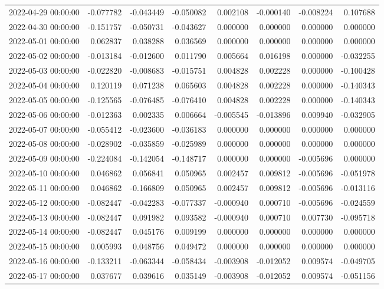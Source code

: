 \begin{tabular}{lrrrrrrr}
2022-04-29 00:00:00 & -0.077782 & -0.043449 & -0.050082 & 0.002108 & -0.000140 & -0.008224 & 0.107688 \\
2022-04-30 00:00:00 & -0.151757 & -0.050731 & -0.043627 & 0.000000 & 0.000000 & 0.000000 & 0.000000 \\
2022-05-01 00:00:00 & 0.062837 & 0.038288 & 0.036569 & 0.000000 & 0.000000 & 0.000000 & 0.000000 \\
2022-05-02 00:00:00 & -0.013184 & -0.012600 & 0.011790 & 0.005664 & 0.016198 & 0.000000 & -0.032255 \\
2022-05-03 00:00:00 & -0.022820 & -0.008683 & -0.015751 & 0.004828 & 0.002228 & 0.000000 & -0.100428 \\
2022-05-04 00:00:00 & 0.120119 & 0.071238 & 0.065603 & 0.004828 & 0.002228 & 0.000000 & -0.140343 \\
2022-05-05 00:00:00 & -0.125565 & -0.076485 & -0.076410 & 0.004828 & 0.002228 & 0.000000 & -0.140343 \\
2022-05-06 00:00:00 & -0.012363 & 0.002335 & 0.006664 & -0.005545 & -0.013896 & 0.009940 & -0.032905 \\
2022-05-07 00:00:00 & -0.055412 & -0.023600 & -0.036183 & 0.000000 & 0.000000 & 0.000000 & 0.000000 \\
2022-05-08 00:00:00 & -0.028902 & -0.035859 & -0.025989 & 0.000000 & 0.000000 & 0.000000 & 0.000000 \\
2022-05-09 00:00:00 & -0.224084 & -0.142054 & -0.148717 & 0.000000 & 0.000000 & -0.005696 & 0.000000 \\
2022-05-10 00:00:00 & 0.046862 & 0.056841 & 0.050965 & 0.002457 & 0.009812 & -0.005696 & -0.051978 \\
2022-05-11 00:00:00 & 0.046862 & -0.166809 & 0.050965 & 0.002457 & 0.009812 & -0.005696 & -0.013116 \\
2022-05-12 00:00:00 & -0.082447 & -0.042283 & -0.077337 & -0.000940 & 0.000710 & -0.005696 & -0.024559 \\
2022-05-13 00:00:00 & -0.082447 & 0.091982 & 0.093582 & -0.000940 & 0.000710 & 0.007730 & -0.095718 \\
2022-05-14 00:00:00 & -0.082447 & 0.045176 & 0.009199 & 0.000000 & 0.000000 & 0.000000 & 0.000000 \\
2022-05-15 00:00:00 & 0.005993 & 0.048756 & 0.049472 & 0.000000 & 0.000000 & 0.000000 & 0.000000 \\
2022-05-16 00:00:00 & -0.133211 & -0.063344 & -0.058434 & -0.003908 & -0.012052 & 0.009574 & -0.049705 \\
2022-05-17 00:00:00 & 0.037677 & 0.039616 & 0.035149 & -0.003908 & -0.012052 & 0.009574 & -0.051156 \\

\end{tabular}
